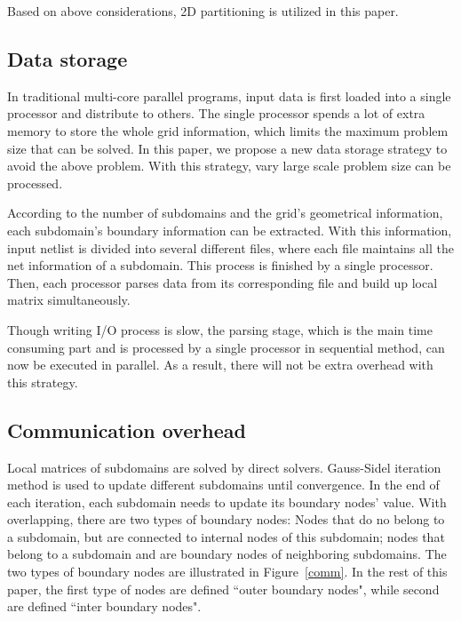 \documentclass{sig-alternate}
\begin{document}
	Based on above considerations, 2D partitioning is utilized in this paper. 
  \subsection{Data storage}
\begin{comment}
	In parallel program, it is very important to keep data balanced among processors. This is not only true for computing
	consideration, but also for memory storage consideration. 
\end{comment}
	In traditional multi-core parallel programs, input data is first loaded into a single processor 
	and distribute to others. The single processor spends a lot of extra memory to store the whole grid information,
	which limits the maximum problem size that can be solved. In this paper, we propose a new data storage strategy to avoid the above problem.
	With this strategy, vary large scale problem size can be processed.

	According to the number of subdomains and the grid's geometrical information, each subdomain's boundary information can be 
	extracted. With this information, input netlist is divided into several different files, where each file maintains all the net 
	information of a subdomain. This process is finished by a single processor. Then, each processor parses data from its
	corresponding file and build up local matrix simultaneously.

	Though writing I/O process is slow, the parsing stage, which is the main time consuming part and is 
	processed by a single processor in sequential method, can now be executed in parallel. As a result, 
	there will not be extra overhead with this strategy. 
     \subsection{Communication overhead}
	Local matrices of subdomains are solved by direct solvers. Gauss-Sidel iteration method is used
	to update different subdomains until convergence. In the end of each iteration, each subdomain needs to update its 
	boundary nodes' value. With overlapping, there are two types of boundary nodes: Nodes that do no 
	belong to a subdomain, but are connected to internal nodes of 
	this subdomain; nodes that belong to a subdomain and are boundary nodes of neighboring subdomains. The 
	two types of boundary nodes are illustrated in Figure~\ref{comm}. In the rest of this paper, the first type of nodes are defined
	``outer boundary nodes", while second are defined ``inter boundary nodes". 
\end{document}

